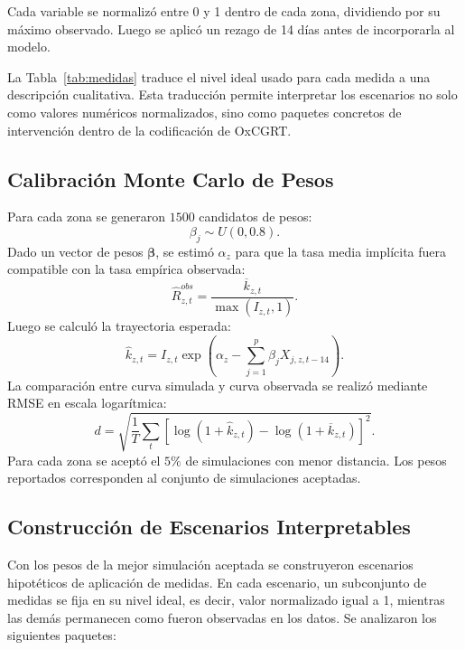 \documentclass[12pt]{article}
\begin{document}
Cada variable se normalizó entre 0 y 1 dentro de cada zona, dividiendo por su
máximo observado. Luego se aplicó un rezago de 14 días antes de incorporarla al
modelo.

La Tabla~\ref{tab:medidas} traduce el nivel ideal usado para cada medida a una
descripción cualitativa. Esta traducción permite interpretar los escenarios no
solo como valores numéricos normalizados, sino como paquetes concretos de
intervención dentro de la codificación de OxCGRT.

\begin{table}[htbp]
  \centering
  \caption{Interpretación de niveles ideales de medidas sanitarias.}
  \label{tab:medidas}
  \resizebox{\textwidth}{!}{}
\end{table}

\subsection{Calibración Monte Carlo de Pesos}

Para cada zona se generaron \(1500\) candidatos de pesos:
\[
  \beta_j \sim U(0, 0.8).
\]
Dado un vector de pesos \(\boldsymbol{\beta}\), se estimó \(\alpha_z\) para que
la tasa media implícita fuera compatible con la tasa empírica observada:
\[
  \widehat{R}_{z,t}^{obs} =
  \frac{\overline{k}_{z,t}}{\max(I_{z,t}, 1)}.
\]
Luego se calculó la trayectoria esperada:
\[
  \widehat{k}_{z,t} =
  I_{z,t}
  \exp\left(
    \alpha_z - \sum_{j=1}^{p} \beta_j X_{j,z,t-14}
  \right).
\]
La comparación entre curva simulada y curva observada se realizó mediante RMSE
en escala logarítmica:
\[
  d =
  \sqrt{
    \frac{1}{T}
    \sum_t
    \left[
      \log(1 + \widehat{k}_{z,t})
      -
      \log(1 + \overline{k}_{z,t})
    \right]^2
  }.
\]
Para cada zona se aceptó el \(5\%\) de simulaciones con menor distancia. Los
pesos reportados corresponden al conjunto de simulaciones aceptadas.

\subsection{Construcción de Escenarios Interpretables}

Con los pesos de la mejor simulación aceptada se construyeron escenarios
hipotéticos de aplicación de medidas. En cada escenario, un subconjunto de
medidas se fija en su nivel ideal, es decir, valor normalizado igual a 1,
mientras las demás permanecen como fueron observadas en los datos. Se analizaron
los siguientes paquetes:
\end{document}
